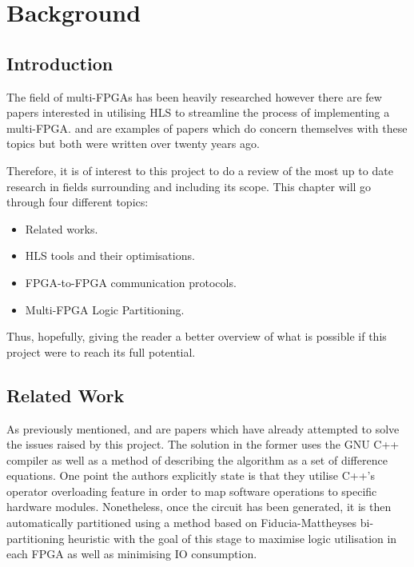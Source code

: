 \chapter{Background}
\label{chap:Background}

\section{Introduction}

The field of multi-FPGAs has been heavily researched however there are few papers interested in utilising HLS to streamline the process of implementing a multi-FPGA. \cite{564741} and \cite{707888} are examples of papers which do concern themselves with these topics but both were written over twenty years ago.

Therefore, it is of interest to this project to do a review of the most up to date research in fields surrounding and including its scope. This chapter will go through four different topics:

\begin{itemize}
    \item Related works.
    \item HLS tools and their optimisations.
    \item FPGA-to-FPGA communication protocols.
    \item Multi-FPGA Logic Partitioning.
\end{itemize}

Thus, hopefully, giving the reader a better overview of what is possible if this project were to reach its full potential.

\section{Related Work}

As previously mentioned, \cite{564741} and \cite{707888} are papers which have already attempted to solve the issues raised by this project. The solution in the former uses the GNU C++ compiler as well as a method of describing the algorithm as a set of difference equations. One point the authors explicitly state is that they utilise C++'s operator overloading feature in order to map software operations to specific hardware modules. Nonetheless, once the circuit has been generated, it is then automatically partitioned using a method based on Fiducia-Mattheyses bi-partitioning heuristic \cite{1585498} with the goal of this stage to maximise logic utilisation in each FPGA as well as minimising IO consumption.

